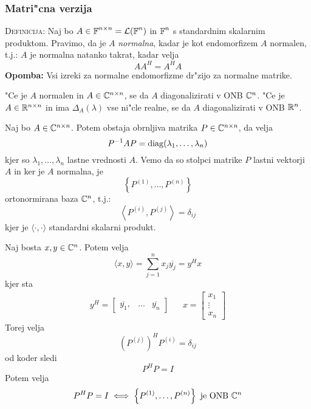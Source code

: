 \subsubsection{Matri"cna verzija}
\textsc{Definicija:} Naj bo $A \in \operatorname{\mathbb{F}}^{n \times n} = \mathcal{L}(\operatorname{\mathbb{F}}^n)$ in $\operatorname{\mathbb{F}}^n$ s standardnim skalarnim produktom. Pravimo, da je $A$ \emph{normalna}, kadar je kot endomorfizem $A$ normalen, t.j.: $A$ je normalna natanko takrat, kadar velja
\begin{equation*}
A A^H = A^H A
\end{equation*}
\textbf{Opomba:} Vsi izreki za normalne endomorfizme dr"zijo za normalne matrike.

"Ce je $A$ normalen in $A \in \mathbb{C}^{n \times n}$, se da $A$ diagonalizirati v ONB $\mathbb{C}^n$. "Ce je $A \in \mathbb{R}^{n\times n}$ in ima $\Delta_A(\lambda)$ vse ni"cle realne, se da $A$ diagonalizirati v ONB $\mathbb{R}^n$.

Naj bo $A \in \mathbb{C}^{n \times n}$. Potem obstaja obrnljiva matrika $P \in \mathbb{C}^{n \times n}$, da velja
\begin{equation*}
P^{-1}AP = \operatorname{diag}(\lambda_1, \ldots, \lambda_n)
\end{equation*}
kjer so $\lambda_1, \ldots, \lambda_n$ lastne vrednosti $A$. Vemo da so stolpci matrike $P$ lastni vektorji $A$ in ker je $A$ normalna, je
\begin{equation*}
\left\{ P^{(1)}, \ldots, P^{(n)} \right\}
\end{equation*}
ortonormirana baza $\mathbb{C}^n$, t.j.:
\begin{equation*}
\left\langle P^{(i)}, P^{(j)} \right\rangle = \delta_{ij}
\end{equation*}
kjer je $\langle \cdot, \cdot \rangle$ standardni skalarni produkt.

Naj bosta $x, y \in \mathbb{C}^n$. Potem velja
\begin{equation*}
\langle x, y \rangle = \sum_{j=1}^n x_j \overline{y_j} = y^H x
\end{equation*}
kjer sta
\begin{align*}
y^H = \begin{bmatrix}\overline{y_1}, & \ldots & \overline{y_n}\end{bmatrix} && x = \begin{bmatrix}
x_1 \\
\vdots \\
x_n
\end{bmatrix}
\end{align*}
Torej velja
\begin{equation*}
\left( P^{(j)} \right)^H P^{(i)} = \delta_{ij}
\end{equation*}
od koder sledi
\begin{equation*}
P^H P = I
\end{equation*}
Potem velja
\begin{equation*}
P^H P = I \iff \left\{ P^{(1)}, \ldots, P^{(n)} \right\} \text{ je ONB $\mathbb{C}^n$}
\end{equation*}

